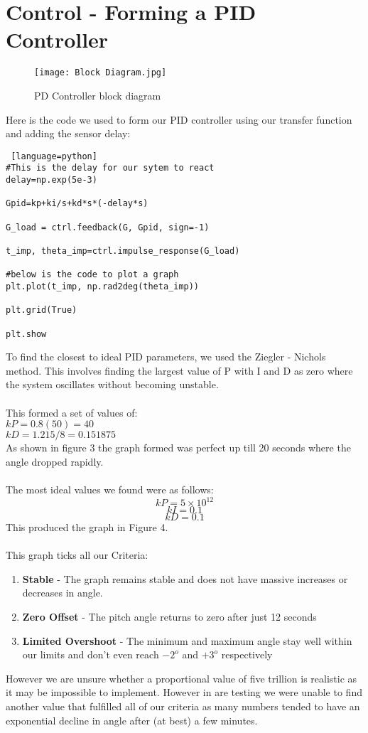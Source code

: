\documentclass{article}
\numberwithin{equation}{section}
\begin{document}
\section{Control - Forming a PID Controller}
\begin{figure}
    \centering
    \texttt{[image: Block Diagram.jpg]}
    \caption{PD Controller block diagram}
    \label{fig:enter-label}
\end{figure}
Here is the code we used to form our PID controller using our transfer function and adding the sensor delay:
\begin{lstlisting} [language=python]
#This is the delay for our sytem to react
delay=np.exp(5e-3)

Gpid=kp+ki/s+kd*s*(-delay*s)

G_load = ctrl.feedback(G, Gpid, sign=-1)

t_imp, theta_imp=ctrl.impulse_response(G_load)

#below is the code to plot a graph
plt.plot(t_imp, np.rad2deg(theta_imp))

plt.grid(True)

plt.show

\end{lstlisting}
To find the closest to ideal PID parameters, we used the Ziegler - Nichols method.
This involves finding the largest value of P with I and D as zero where the system oscillates without becoming unstable. \\\\
This formed a set of values of:\\
\(kP = 0.8(50) = 40\)\\
\(kD = 1.215/8 = 0.151875\)\\
As shown in figure 3 the graph formed was perfect up till 20 seconds where the angle dropped rapidly.\\\\
The most ideal values we found were as follows:\\
\[kP = 5\times10^{12}\]
\[kI = 0.1\]
\[kD = 0.1\]
This produced the graph in Figure 4.\\\\
This graph ticks all our Criteria:
\begin{enumerate}
\item [\checkmark] \textbf{Stable} - The graph remains stable and does not have massive increases or decreases in angle. 
\item [\checkmark] \textbf{Zero Offset} - The pitch angle returns to zero after just 12 seconds
\item [\checkmark] \textbf{Limited Overshoot} - The minimum and maximum angle stay well within our limits and don't even reach \(-2^o\) and \(+3^o\) respectively  
\end{enumerate}
%
However we are unsure whether a proportional value of five trillion is realistic as it may be impossible to implement. However in are testing we were unable to find another value that fulfilled all of our criteria as many numbers tended to have an exponential decline in angle after (at best) a few minutes.
\end{document}
